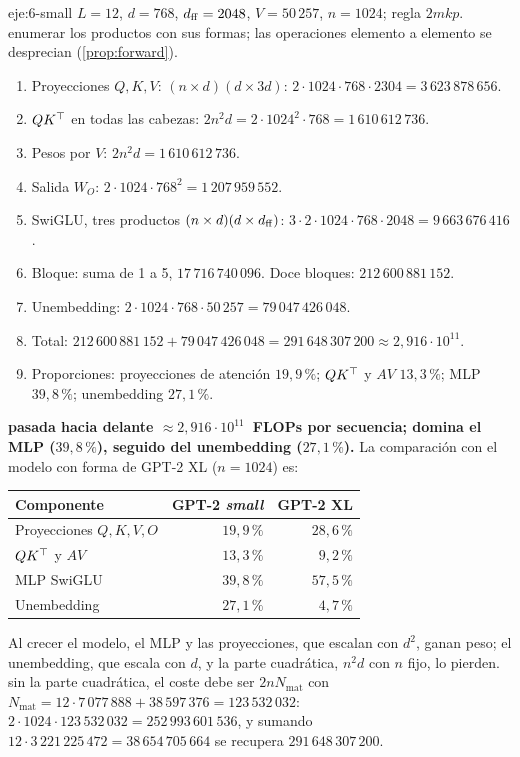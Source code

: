 \begin{solucion}{eje:6-small}
\datos $L=12$, $d=768$, $d_{\mathrm{ff}}=2048$, $V=50\,257$, $n=1024$; regla $2mkp$.
\planteamiento enumerar los productos con sus formas; las operaciones elemento a elemento se desprecian (\cref{prop:forward}).
\pasos
\begin{enumerate}[label=\arabic*.]
  \item Proyecciones $Q,K,V$: $(n\times d)(d\times 3d)$: $2\cdot 1024\cdot 768\cdot 2304=3\,623\,878\,656$.
  \item $QK^{\top}$ en todas las cabezas: $2n^{2}d=2\cdot 1024^{2}\cdot 768=1\,610\,612\,736$.
  \item Pesos por $V$: $2n^{2}d=1\,610\,612\,736$.
  \item Salida $W_O$: $2\cdot 1024\cdot 768^{2}=1\,207\,959\,552$.
  \item SwiGLU, tres productos $(n\times d)(d\times d_{\mathrm{ff}})$: $3\cdot 2\cdot 1024\cdot 768\cdot 2048=9\,663\,676\,416$.
  \item Bloque: suma de 1 a 5, $17\,716\,740\,096$. Doce bloques: $212\,600\,881\,152$.
  \item Unembedding: $2\cdot 1024\cdot 768\cdot 50\,257=79\,047\,426\,048$.
  \item Total: $212\,600\,881\,152+79\,047\,426\,048=291\,648\,307\,200\approx 2{,}916\cdot 10^{11}$.
  \item Proporciones: proyecciones de atención $19{,}9\,\%$; $QK^{\top}$ y $AV$ $13{,}3\,\%$; MLP $39{,}8\,\%$; unembedding $27{,}1\,\%$.
\end{enumerate}
\resultado \textbf{pasada hacia delante $\approx 2{,}916\cdot 10^{11}$~FLOPs por secuencia; domina el MLP ($39{,}8\,\%$), seguido del unembedding ($27{,}1\,\%$).} La comparación con el modelo con forma de GPT-2 XL ($n=1024$) es:
\begin{center}\small
\begin{tabular}{@{}lrr@{}}
\toprule
Componente & GPT-2 \emph{small} & GPT-2 XL \\
\midrule
Proyecciones $Q,K,V,O$ & $19{,}9\,\%$ & $28{,}6\,\%$ \\
$QK^{\top}$ y $AV$ & $13{,}3\,\%$ & $9{,}2\,\%$ \\
MLP SwiGLU & $39{,}8\,\%$ & $57{,}5\,\%$ \\
Unembedding & $27{,}1\,\%$ & $4{,}7\,\%$ \\
\bottomrule
\end{tabular}
\end{center}
Al crecer el modelo, el MLP y las proyecciones, que escalan con $d^{2}$, ganan peso; el unembedding, que escala con $d$, y la parte cuadrática, $n^{2}d$ con $n$ fijo, lo pierden.
\comprobacion sin la parte cuadrática, el coste debe ser $2nN_{\mathrm{mat}}$ con $N_{\mathrm{mat}}=12\cdot 7\,077\,888+38\,597\,376=123\,532\,032$: $2\cdot 1024\cdot 123\,532\,032=252\,993\,601\,536$, y sumando $12\cdot 3\,221\,225\,472=38\,654\,705\,664$ se recupera $291\,648\,307\,200$.
\end{solucion}

